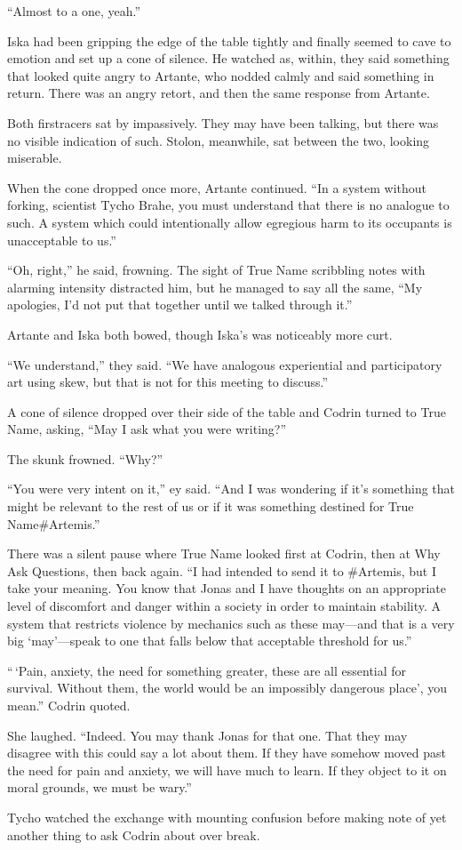 ``Almost to a one, yeah.''

Iska had been gripping the edge of the table tightly and finally seemed to cave to emotion and set up a cone of silence. He watched as, within, they said something that looked quite angry to Artante, who nodded calmly and said something in return. There was an angry retort, and then the same response from Artante.

Both firstracers sat by impassively. They may have been talking, but there was no visible indication of such. Stolon, meanwhile, sat between the two, looking miserable.

When the cone dropped once more, Artante continued. ``In a system without forking, scientist Tycho Brahe, you must understand that there is no analogue to such. A system which could intentionally allow egregious harm to its occupants is unacceptable to us.''

``Oh, right,'' he said, frowning. The sight of True Name scribbling notes with alarming intensity distracted him, but he managed to say all the same, ``My apologies, I'd not put that together until we talked through it.''

Artante and Iska both bowed, though Iska's was noticeably more curt.

``We understand,'' they said. ``We have analogous experiential and participatory art using skew, but that is not for this meeting to discuss.''

A cone of silence dropped over their side of the table and Codrin turned to True Name, asking, ``May I ask what you were writing?''

The skunk frowned. ``Why?''

``You were very intent on it,'' ey said. ``And I was wondering if it's something that might be relevant to the rest of us or if it was something destined for True Name\#Artemis.''

There was a silent pause where True Name looked first at Codrin, then at Why Ask Questions, then back again. ``I had intended to send it to \#Artemis, but I take your meaning. You know that Jonas and I have thoughts on an appropriate level of discomfort and danger within a society in order to maintain stability. A system that restricts violence by mechanics such as these may—and that is a very big `may'—speak to one that falls below that acceptable threshold for us.''

``\,`Pain, anxiety, the need for something greater, these are all essential for survival. Without them, the world would be an impossibly dangerous place', you mean.'' Codrin quoted.

She laughed. ``Indeed. You may thank Jonas for that one. That they may disagree with this could say a lot about them. If they have somehow moved past the need for pain and anxiety, we will have much to learn. If they object to it on moral grounds, we must be wary.''

Tycho watched the exchange with mounting confusion before making note of yet another thing to ask Codrin about over break.
